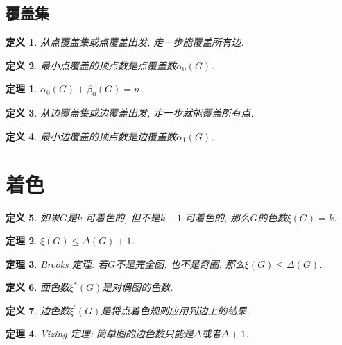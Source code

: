 \documentclass[UTF8,a4paper,11pt]{ctexart}
\newtheorem{definition}{定义}
\newtheorem{theorem}{定理}
\begin{document}
    \subsection{覆盖集}
      \begin{definition}
        从点覆盖集或点覆盖出发, 走一步能覆盖所有边.
      \end{definition}
      \begin{definition}
        最小点覆盖的顶点数是点覆盖数$\alpha_0\left(G\right)$.
      \end{definition}
      \begin{theorem}
        $\alpha_0\left(G\right)+\beta_0\left(G\right)=n$.
      \end{theorem}
      \begin{definition}
        从边覆盖集或边覆盖出发, 走一步就能覆盖所有点.
      \end{definition}
      \begin{definition}
        最小边覆盖的顶点数是边覆盖数$\alpha_1\left(G\right)$.
      \end{definition}
  \section{着色}
    \begin{definition}
      如果$G$是$k$-可着色的, 但不是$k-1$-可着色的,
      那么$G$的色数$\xi\left(G\right)=k$.
    \end{definition}
    \begin{theorem}
      $\xi\left(G\right)\le \Delta\left(G\right)+1$.
    \end{theorem}
    \begin{theorem}
      Brooks 定理:
      若$G$不是完全图, 也不是奇圈,
      那么$\xi\left(G\right)\le \Delta\left(G\right)$.
    \end{theorem}
    \begin{definition}
      面色数$\xi^{*}\left(G\right)$是对偶图的色数.
    \end{definition}
    \begin{definition}
      边色数$\xi^{\prime}\left(G\right)$是将点着色规则应用到边上的结果.
    \end{definition}
    \begin{theorem}
      Vizing 定理:
      简单图的边色数只能是$\Delta$或者$\Delta+1$.
    \end{theorem}
\end{document}
